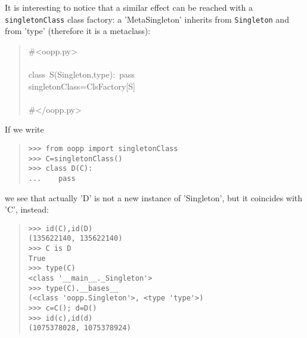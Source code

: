 \documentclass[10pt,english]{article}
\begin{document}
It is interesting to notice that a similar effect can be reached
with a \texttt{singletonClass} class factory: a 'MetaSingleton' inherits
from \texttt{Singleton} and from 'type' (therefore it is a metaclass):
\begin{quote}
\begin{ttfamily}\begin{flushleft}
\mbox{{\#}<oopp.py>}\\
\mbox{}\\
\mbox{class~S(Singleton,type):~pass}\\
\mbox{singletonClass=ClsFactory[S]}\\
\mbox{}\\
\mbox{{\#}</oopp.py>}
\end{flushleft}\end{ttfamily}
\end{quote}

If we write
\begin{quote}
\begin{verbatim}>>> from oopp import singletonClass
>>> C=singletonClass()
>>> class D(C):
...    pass\end{verbatim}
\end{quote}

we see that actually 'D' is not a new instance of 'Singleton', but
it coincides with 'C', instead:
\begin{quote}
\begin{verbatim}>>> id(C),id(D)
(135622140, 135622140)
>>> C is D
True
>>> type(C)
<class '__main__._Singleton'>
>>> type(C).__bases__
(<class 'oopp.Singleton'>, <type 'type'>)
>>> c=C(); d=D()
>>> id(c),id(d)
(1075378028, 1075378924)\end{verbatim}
\end{quote}
\end{document}
